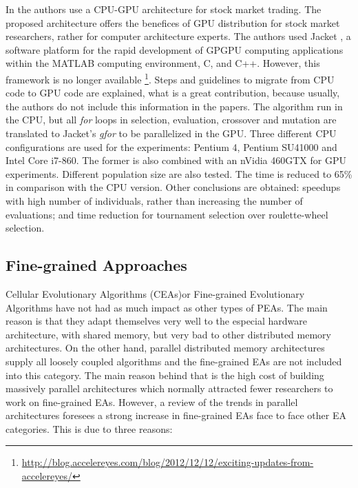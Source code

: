 \documentclass[review]{elsarticle}
\begin{document}
In \cite{Contreras:2012:UGA:2150467.2150469} the authors use a CPU-GPU architecture for stock market trading. The proposed architecture offers the benefices of GPU distribution for stock market researchers, rather for computer architecture experts. The authors used Jacket \cite{jacket:Matlab}, a software platform for the rapid development of GPGPU computing applications within the MATLAB computing environment, C, and C++. However, this framework is no longer available \footnote{\url{http://blog.accelereyes.com/blog/2012/12/12/exciting-updates-from-accelereyes/}}. Steps and guidelines to migrate from CPU code to GPU code are explained, what is a great contribution, because usually, the authors do not include this information in the papers. The algorithm run in the CPU, but all  {\em for} loops in selection, evaluation, crossover and mutation are translated to Jacket's {\em gfor} to be parallelized in the GPU. Three different CPU configurations are used for the experiments: Pentium 4, Pentium SU41000 and Intel Core i7-860. The former is also combined with an nVidia 460GTX for GPU experiments. Different population size are also tested. The time is reduced to 65\% in comparison with the CPU version. Other conclusions are obtained: speedups with high number of individuals, rather than increasing the number of evaluations; and time reduction for  tournament selection  over roulette-wheel selection.

\subsection{Fine-grained Approaches}

Cellular Evolutionary Algorithms (CEAs)or Fine-grained Evolutionary Algorithms have not had as much impact as other types of PEAs. The main reason is that they adapt themselves very well to the especial hardware architecture, with shared memory, but very bad to other distributed memory architectures. On the other hand, parallel distributed memory architectures supply all loosely coupled algorithms and the fine-grained EAs are not included into this category. The main reason behind that is the high cost of building massively parallel architectures which normally attracted fewer researchers to work on fine-grained EAs. However, a review of the trends in parallel architectures foresees a strong increase in fine-grained EAs face to face other EA categories. This is due to three reasons: 
\end{document}
